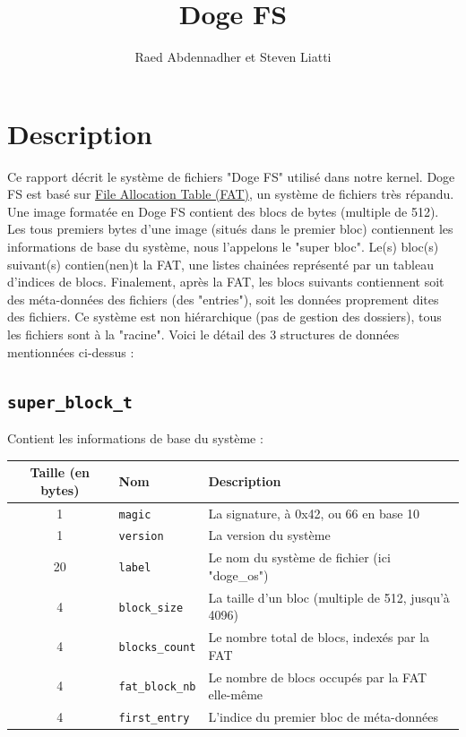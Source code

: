 \documentclass[a4paper, 12pt]{article}
\begin{document}
\title{Doge FS}
\author{Raed Abdennadher et Steven Liatti}
\maketitle


\section{Description}
Ce rapport décrit le système de fichiers "Doge FS" utilisé dans notre kernel. Doge FS est basé sur
\href{https://en.wikipedia.org/wiki/File_Allocation_Table}{File Allocation Table (FAT)}, un système
de fichiers très répandu. Une image formatée en Doge FS contient des blocs de bytes (multiple de 512).
Les tous premiers bytes d'une image (situés dans le premier bloc) contiennent les informations de base
du système, nous l'appelons le "super bloc". Le(s) bloc(s) suivant(s) contien(nen)t la FAT, une listes chainées représenté par un tableau d'indices de blocs. Finalement, après la FAT, les blocs suivants contiennent soit des
méta-données des fichiers (des "entries"), soit les données proprement dites des fichiers. Ce système
est non hiérarchique (pas de gestion des dossiers), tous les fichiers sont à la "racine".
Voici le détail des 3 structures de données mentionnées ci-dessus :

\subsection{\texttt{super_block_t}} Contient les informations de base du système :

\begin{tabular}{|c|l|p{.5\linewidth}|}	\hline
	\textbf{Taille (en bytes)}	& \textbf{Nom} & \textbf{Description} \\ \hline
	1	& \texttt{magic}			& La signature, à 0x42, ou 66 en base 10 				\\ \hline
	1	& \texttt{version}		& La version du système 								\\ \hline
	20	& \texttt{label}			& Le nom du système de fichier (ici "doge\_os")			\\ \hline
	4	& \texttt{block_size}	& La taille d'un bloc (multiple de 512, jusqu'à 4096) 	\\ \hline
	4	& \texttt{blocks_count}		& Le nombre total de blocs, indexés par la FAT 			\\ \hline
	4	& \texttt{fat_block_nb}	& Le nombre de blocs occupés par la FAT elle-même 		\\ \hline
	4	& \texttt{first_entry}	& L'indice du premier bloc de méta-données				\\ \hline
\end{tabular}
\end{document}
